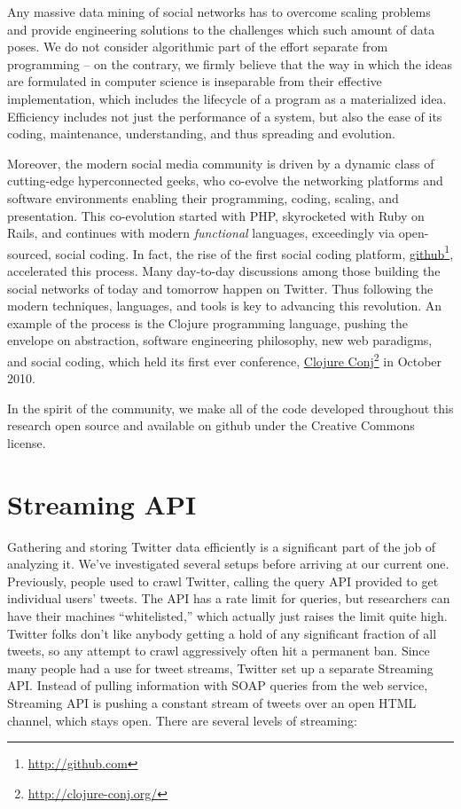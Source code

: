 \documentclass[10pt,oneside]{memoir}
\begin{document}
\begin{Spacing}{2}
Any massive data mining of social networks has to overcome scaling problems and provide engineering solutions to the challenges which such amount of data poses.  We do not consider algorithmic part of the effort separate from programming -- on the contrary, we firmly believe that the way in which the ideas are formulated in computer science is inseparable from their effective implementation, which includes the lifecycle of a program as a materialized idea.  Efficiency includes not just the performance of a system, but also the ease of its coding, maintenance, understanding, and thus spreading and evolution.


Moreover, the modern social media community is driven by a dynamic class of cutting-edge hyperconnected geeks, who co-evolve the networking platforms and software environments enabling their programming, coding, scaling, and presentation.  This co-evolution started with PHP, skyrocketed with Ruby on Rails, and continues with modern {\itshape functional} languages, exceedingly via open-sourced, social coding.  In fact, the rise of the first social coding platform, \href{http://github.com}{github}\footnote{\href{http://github.com}{http://github.com}}, accelerated this process. Many day-to-day discussions among those building the social networks of today and tomorrow happen on Twitter.  Thus following the modern techniques, languages, and tools is key to advancing this revolution.  An example of the process is the Clojure programming language, pushing the envelope on abstraction, software engineering philosophy, new web paradigms, and social coding, which held its first ever conference, \href{http://clojure-conj.org/}{Clojure Conj}\footnote{\href{http://clojure-conj.org/}{http://clojure-conj.org/}} in October 2010.


In the spirit of the community, we make all of the code developed throughout this research open source and available on github under the Creative Commons license.


\pagebreak \section{Streaming API}
\label{streamingapi}

\label{StreamingAPI}


Gathering and storing Twitter data efficiently is a significant part of the job of analyzing it.  We've investigated several setups before arriving at our current one.  Previously, people used to crawl Twitter, calling the query API provided to get individual users' tweets.  The API has a rate limit for queries, but researchers can have their machines ``whitelisted,'' which actually just raises the limit quite high.  Twitter folks don't like anybody getting a hold of any significant fraction of all tweets, so any attempt to crawl aggressively often hit a permanent ban.  Since many people had a use for tweet streams, Twitter set up a separate Streaming API.  Instead of pulling information with SOAP queries from the web service, Streaming API is pushing a constant stream of tweets over an open HTML channel, which stays open.  There are several levels of streaming:



\end{Spacing}
\end{document}
